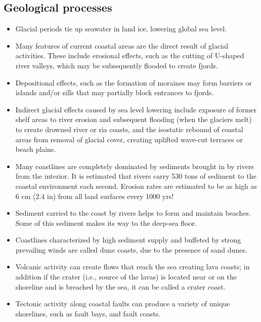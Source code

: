 \documentclass{article}
\begin{document}
	\subsection{Geological processes}
	\begin{itemize}
		\item Glacial periods tie up seawater in land ice, lowering global sea level. 
		\item Many features of current coastal areas are the direct result of glacial activities. These include erosional effects, such as the cutting of U-shaped river valleys, which may be subsequently flooded to create fjords.
		\item Depositional effects, such as the formation of moraines may form barriers or islands and/or sills that may partially block entrances to fjords.
		\item Indirect glacial effects caused by sea level lowering include exposure of former shelf areas to river erosion and subsequent flooding (when the glaciers melt) to create drowned river or ria coasts, and the isostatic rebound of coastal areas from removal of glacial cover, creating uplifted wave-cut terraces or beach plains.
		\item Many coastlines are completely dominated by sediments brought in by rivers from the interior. It is estimated that rivers carry 530 tons of sediment to the coastal environment each second.  Erosion rates are estimated to be as high as 6 cm (2.4 in) from all land surfaces every 1000 yrs!
		\item Sediment carried to the coast by rivers helps to form and maintain beaches.  Some of this sediment makes its way to the deep-sea floor.
		\item Coastlines characterized by high sediment supply and buffeted by strong prevailing winds are called dune coasts, due to the presence of sand dunes.
		\item Volcanic activity can create flows that reach the sea creating lava coasts; in addition if the crater (i.e., source of the lavas) is located near or on the shoreline and is breached by the sea, it can be called a crater coast.
		\item Tectonic activity along coastal faults can produce a variety of unique shorelines, such as fault bays, and fault coasts.
	\end{itemize}
\end{document}
